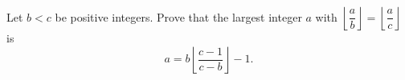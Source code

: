 Let $b<c$ be positive integers. Prove that the largest integer $a$ with $\left\lfloor\dfrac ab\right\rfloor=\left\lfloor\dfrac ac\right\rfloor$ is
\[a=b\left\lfloor\dfrac{c-1}{c-b}\right\rfloor-1.\]
